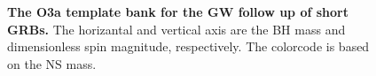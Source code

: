 \documentclass[binding=0.6cm, LaM]{sapthesis}
\begin{document}
        \begin{figure}[t]
          \noindent
          \label{banktest}
          \centering
          \caption{{\bf The O3a template bank for the GW follow up of short GRBs.} The horizantal and vertical axis are the BH mass and dimensionless spin magnitude, respectively.  The colorcode is based on the NS mass.}
          \label{fig:banktest}
        \end{figure}
\end{document}
